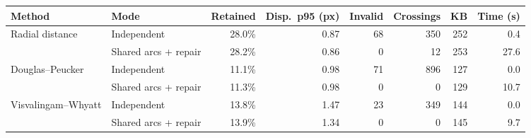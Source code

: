 \begin{tabular}{llrrrrrr}
\toprule
Method & Mode & Retained & Disp.\ p95 (px) & Invalid & Crossings & KB & Time (s) \\
\midrule
Radial distance & Independent & 28.0\% & 0.87 & 68 & 350 & 252 & 0.4 \\
 & Shared arcs + repair & 28.2\% & 0.86 & 0 & 12 & 253 & 27.6 \\
\midrule
Douglas–Peucker & Independent & 11.1\% & 0.98 & 71 & 896 & 127 & 0.0 \\
 & Shared arcs + repair & 11.3\% & 0.98 & 0 & 0 & 129 & 10.7 \\
\midrule
Visvalingam–Whyatt & Independent & 13.8\% & 1.47 & 23 & 349 & 144 & 0.0 \\
 & Shared arcs + repair & 13.9\% & 1.34 & 0 & 0 & 145 & 9.7 \\
\bottomrule
\end{tabular}